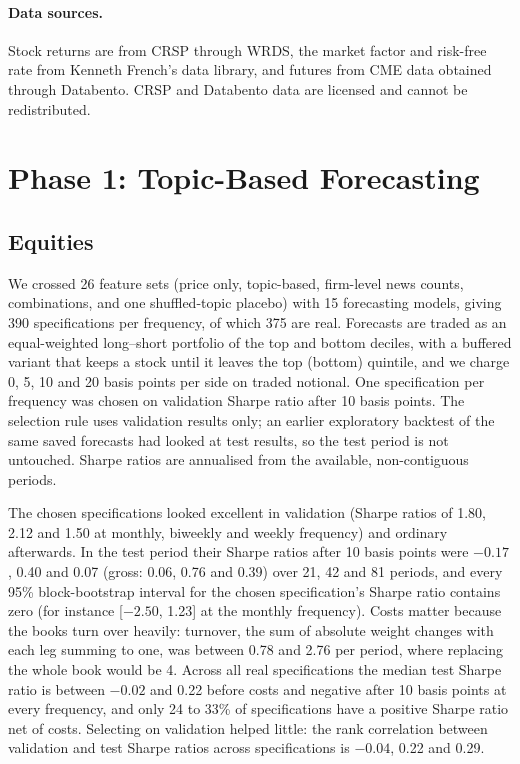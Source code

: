 \documentclass[11pt]{article}
\begin{document}
\paragraph{Data sources.} Stock returns are from CRSP through WRDS, the market factor and risk-free rate from Kenneth French's data library, and futures from CME data obtained through Databento. CRSP and Databento data are licensed and cannot be redistributed.

\section{Phase 1: Topic-Based Forecasting}
\label{sec:phase1}

\subsection{Equities}

We crossed 26 feature sets (price only, topic-based, firm-level news counts, combinations, and one shuffled-topic placebo) with 15 forecasting models, giving 390 specifications per frequency, of which 375 are real. Forecasts are traded as an equal-weighted long--short portfolio of the top and bottom deciles, with a buffered variant that keeps a stock until it leaves the top (bottom) quintile, and we charge 0, 5, 10 and 20 basis points per side on traded notional. One specification per frequency was chosen on validation Sharpe ratio after 10 basis points. The selection rule uses validation results only; an earlier exploratory backtest of the same saved forecasts had looked at test results, so the test period is not untouched. Sharpe ratios are annualised from the available, non-contiguous periods.

The chosen specifications looked excellent in validation (Sharpe ratios of 1.80, 2.12 and 1.50 at monthly, biweekly and weekly frequency) and ordinary afterwards. In the test period their Sharpe ratios after 10 basis points were $-0.17$, 0.40 and 0.07 (gross: 0.06, 0.76 and 0.39) over 21, 42 and 81 periods, and every 95\% block-bootstrap interval for the chosen specification's Sharpe ratio contains zero (for instance [$-2.50$, 1.23] at the monthly frequency). Costs matter because the books turn over heavily: turnover, the sum of absolute weight changes with each leg summing to one, was between 0.78 and 2.76 per period, where replacing the whole book would be 4. Across all real specifications the median test Sharpe ratio is between $-0.02$ and 0.22 before costs and negative after 10 basis points at every frequency, and only 24 to 33\% of specifications have a positive Sharpe ratio net of costs. Selecting on validation helped little: the rank correlation between validation and test Sharpe ratios across specifications is $-0.04$, 0.22 and 0.29.
\end{document}
